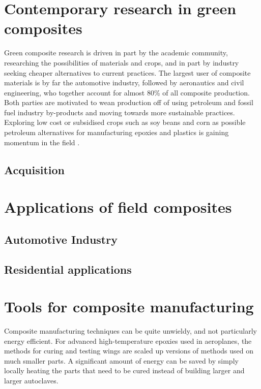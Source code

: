 \documentclass[]{report}
\begin{document}
\chapter{Contemporary research in green composites}
\label{chap:research}

Green composite research is driven in part by the academic community, researching the possibilities of materials and crops, and in part by industry seeking cheaper alternatives to current practices.  The largest user of composite materials is by far the automotive industry, followed by aeronautics and civil engineering, who together account for almost 80\% of all composite production.  Both parties are motivated to wean production off of using petroleum and fossil fuel industry by-products and moving towards more sustainable practices.  Exploring low cost or subsidised crops such as soy beans and corn as possible petroleum alternatives for manufacturing epoxies and plastics is gaining momentum in the field \cite{soyepoxy}.

\section{Acquisition}

\chapter{Applications of field composites}
\label{chap:applications}

\section{Automotive Industry}
\section{Residential applications}




\chapter{Tools for composite manufacturing}
\label{chap:tools}

Composite manufacturing techniques can be quite unwieldy, and not particularly energy efficient.  For advanced high-temperature epoxies used in aeroplanes, the methods for curing and testing wings are scaled up versions of methods used on much smaller parts.  A significant amount of energy can be saved by simply locally heating the parts that need to be cured instead of building larger and larger autoclaves.
\end{document}
